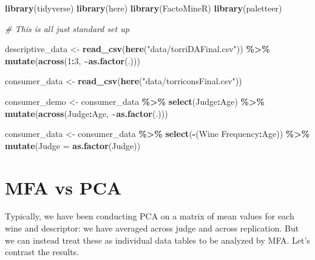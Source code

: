 \documentclass[
]{book}
\newenvironment{Shaded}{\begin{snugshade}}{\end{snugshade}}
\newcommand{\AttributeTok}[1]{\textcolor[rgb]{0.13,0.29,0.53}{#1}}
\newcommand{\CommentTok}[1]{\textcolor[rgb]{0.56,0.35,0.01}{\textit{#1}}}
\newcommand{\DecValTok}[1]{\textcolor[rgb]{0.00,0.00,0.81}{#1}}
\newcommand{\FunctionTok}[1]{\textcolor[rgb]{0.13,0.29,0.53}{\textbf{#1}}}
\newcommand{\NormalTok}[1]{#1}
\newcommand{\OtherTok}[1]{\textcolor[rgb]{0.56,0.35,0.01}{#1}}
\newcommand{\SpecialCharTok}[1]{\textcolor[rgb]{0.81,0.36,0.00}{\textbf{#1}}}
\newcommand{\StringTok}[1]{\textcolor[rgb]{0.31,0.60,0.02}{#1}}
\begin{document}
\begin{Shaded}
\begin{Highlighting}[]
\FunctionTok{library}\NormalTok{(tidyverse)}
\FunctionTok{library}\NormalTok{(here)}
\FunctionTok{library}\NormalTok{(FactoMineR)}
\FunctionTok{library}\NormalTok{(paletteer)}

\CommentTok{\# This is all just standard set up}

\NormalTok{descriptive\_data }\OtherTok{\textless{}{-}} 
  \FunctionTok{read\_csv}\NormalTok{(}\FunctionTok{here}\NormalTok{(}\StringTok{"data/torriDAFinal.csv"}\NormalTok{)) }\SpecialCharTok{\%\textgreater{}\%}
  \FunctionTok{mutate}\NormalTok{(}\FunctionTok{across}\NormalTok{(}\DecValTok{1}\SpecialCharTok{:}\DecValTok{3}\NormalTok{, }\SpecialCharTok{\textasciitilde{}}\FunctionTok{as.factor}\NormalTok{(.)))}

\NormalTok{consumer\_data }\OtherTok{\textless{}{-}} \FunctionTok{read\_csv}\NormalTok{(}\FunctionTok{here}\NormalTok{(}\StringTok{"data/torriconsFinal.csv"}\NormalTok{))}

\NormalTok{consumer\_demo }\OtherTok{\textless{}{-}} 
\NormalTok{  consumer\_data }\SpecialCharTok{\%\textgreater{}\%}
  \FunctionTok{select}\NormalTok{(Judge}\SpecialCharTok{:}\NormalTok{Age) }\SpecialCharTok{\%\textgreater{}\%}
  \FunctionTok{mutate}\NormalTok{(}\FunctionTok{across}\NormalTok{(Judge}\SpecialCharTok{:}\NormalTok{Age, }\SpecialCharTok{\textasciitilde{}}\FunctionTok{as.factor}\NormalTok{(.)))}

\NormalTok{consumer\_data }\OtherTok{\textless{}{-}} 
\NormalTok{  consumer\_data }\SpecialCharTok{\%\textgreater{}\%}
  \FunctionTok{select}\NormalTok{(}\SpecialCharTok{{-}}\NormalTok{(}\StringTok{\textasciigrave{}}\AttributeTok{Wine Frequency}\StringTok{\textasciigrave{}}\SpecialCharTok{:}\NormalTok{Age)) }\SpecialCharTok{\%\textgreater{}\%}
  \FunctionTok{mutate}\NormalTok{(}\AttributeTok{Judge =} \FunctionTok{as.factor}\NormalTok{(Judge))}
\end{Highlighting}
\end{Shaded}

\section{MFA vs PCA}\label{mfa-vs-pca}

Typically, we have been conducting PCA on a matrix of mean values for each wine and descriptor: we have averaged across judge and across replication. But we can instead treat these as individual data tables to be analyzed by MFA. Let's contrast the results.
\end{document}
